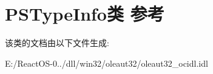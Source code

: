 \hypertarget{class_p_s_type_info}{}\section{P\+S\+Type\+Info类 参考}
\label{class_p_s_type_info}


该类的文档由以下文件生成\+:\begin{DoxyCompactItemize}
\item 
E\+:/\+React\+O\+S-\/0../dll/win32/oleaut32/oleaut32\+\_\+ocidl.\+idl\end{DoxyCompactItemize}
